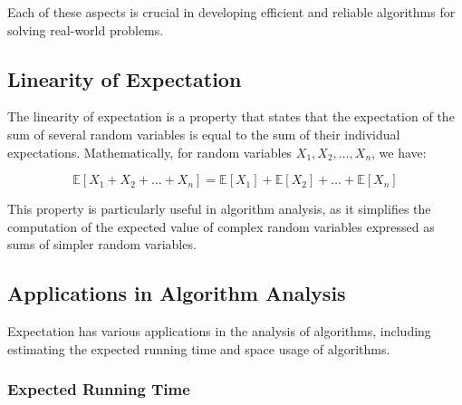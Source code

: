 \documentclass[12pt]{book} %
\begin{document}
Each of these aspects is crucial in developing efficient and reliable algorithms for solving real-world problems.

\subsection{Linearity of Expectation}

The linearity of expectation is a property that states that the expectation of the sum of several random variables is equal to the sum of their individual expectations. Mathematically, for random variables \(X_1, X_2, \ldots, X_n\), we have:

\[
\mathbb{E}[X_1 + X_2 + \ldots + X_n] = \mathbb{E}[X_1] + \mathbb{E}[X_2] + \ldots + \mathbb{E}[X_n]
\]

This property is particularly useful in algorithm analysis, as it simplifies the computation of the expected value of complex random variables expressed as sums of simpler random variables.

\subsection{Applications in Algorithm Analysis}

Expectation has various applications in the analysis of algorithms, including estimating the expected running time and space usage of algorithms.

\subsubsection{Expected Running Time}
\end{document}

